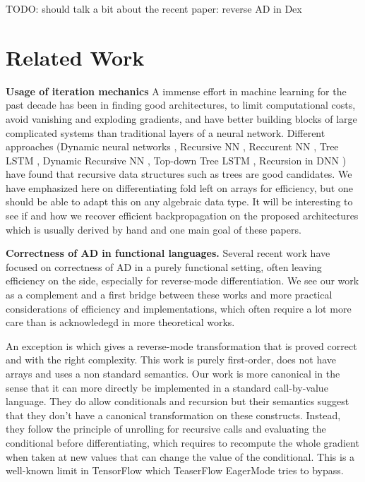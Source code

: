TODO: should talk a bit about the recent paper: reverse AD in Dex \cite{paszke2021getting}

\section{Related Work} %
\label{sec:related_work}

\noindent \textbf{Usage of iteration mechanics}
A immense effort in machine learning for the past decade has been in finding
good architectures, to limit computational costs, 
avoid vanishing and exploding gradients, 
and have better building blocks of large complicated systems than traditional layers of a neural network.
Different approaches 
(Dynamic neural networks \cite{jin2017manipulability,wu2016deep}, 
Recursive NN \cite{socher2011parsing,biancofiore2017recursive}, 
Reccurent NN \cite{bahdanau2014neural,luong2015effective}, 
Tree LSTM \cite{tai2015improved,chen2016enhanced}, 
Dynamic Recursive NN \cite{guo2019dynamic}, 
Top-down Tree LSTM \cite{zhang2015top}, 
Recursion in DNN \cite{jeong2018improving}) 
have found that recursive data structures such as trees are good candidates.
We have emphasized here on differentiating fold left on arrays for efficiency, 
but one should be able to adapt this on any algebraic data type. 
It will be interesting to see if and how we recover efficient backpropagation on the proposed architectures 
which is usually derived by hand and one main goal of these papers.

\noindent \textbf{Correctness of AD in functional languages.}
Several recent work \cite{huot2020correctness,vakar2020reverse,vakar2020denotational,brunel2019backpropagation,barthe2020versatility,mazza2021automatic,ee2020correctness} have focused on correctness of AD in a purely functional setting, 
often leaving efficiency on the side, especially for reverse-mode differentiation. 
We see our work as a complement and a first bridge between these works 
and more practical considerations of efficiency and implementations, 
which often require a lot more care than is acknowledegd in more theoretical works.

An exception is \cite{abadi-plotkin2020} which gives a reverse-mode transformation that is proved correct and with the right complexity.
This work is purely first-order, does not have arrays and uses a non standard semantics. 
Our work is more canonical in the sense that it can more directly be implemented in a standard call-by-value language.
They do allow conditionals and recursion but their semantics suggest that they don't have a canonical transformation on these constructs. 
Instead, they follow the principle of unrolling for recursive calls and evaluating the conditional before differentiating, 
which requires to recompute the whole gradient when taken at new values that can change the value of the conditional. 
This is a well-known limit in TensorFlow \cite{abadi2016tensorflow} which TeaserFlow EagerMode \cite{agrawal2019tensorflow} tries to bypass. 

